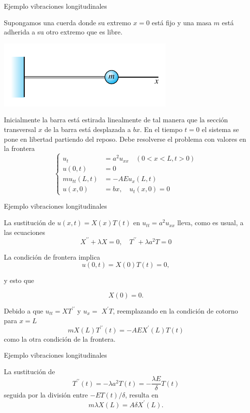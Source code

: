  

 
{Ejemplo vibraciones longitudinales}

Supongamos una cuerda  donde su extremo $x=0$ está fijo y una masa $m$ está adherida a su otro extremo que es libre. 

\begin{center}
\includegraphics[scale=.4]{imagenes/barra2.png}
\end{center}



Inicialmente la barra está estirada linealmente de tal manera que la sección transversal $x$ de la barra está  desplazada a $b x$. En el tiempo $t=0$ el sistema se pone en libertad partiendo del reposo. Debe resolverse el problema con valores en la frontera
$$
\left\{
\begin{aligned}
u_{t} &=a^{2} u_{x x} \quad(0<x<L, t>0) \\
u(0, t) &=0 \\
m u_{t t}(L, t) &=-A E u_{x}(L, t) \\
u(x, 0) &=b x, \quad u_{t}(x, 0)=0
\end{aligned}
\right.
$$
 

 
{Ejemplo vibraciones longitudinales}

 La sustitución de $u(x, t)=X(x) T(t)$ en $u_{t t}=a^{2} u_{x x}$ lleva, como es usual, a las ecuaciones
$$
X^{\prime \prime}+\lambda X=0, \quad T^{\prime \prime}+\lambda a^{2} T=0
$$


La condición de frontera implica 
$$u(0, t)=X(0) T(t)=0,$$

y esto que

$$X(0)=0.$$


Debido a que $u_{t t}=X T^{\prime \prime}$ y $u_{x}=$ $X^{\prime} T$, reemplazando en la condición de cotorno para $x=L$  
$$
m X(L) T^{\prime \prime}(t)=-A E X^{\prime}(L) T(t)
$$
como la otra condición de la frontera. 

 

 
{Ejemplo vibraciones longitudinales}


La sustitución de
$$
T^{\prime \prime}(t)=-\lambda a^{2} T(t)=-\frac{\lambda E}{\delta} T(t)
$$
seguida por la división entre $-E T(t) / \delta$, resulta en 
$$m \lambda X(L)=A \delta X^{\prime}(L).$$


